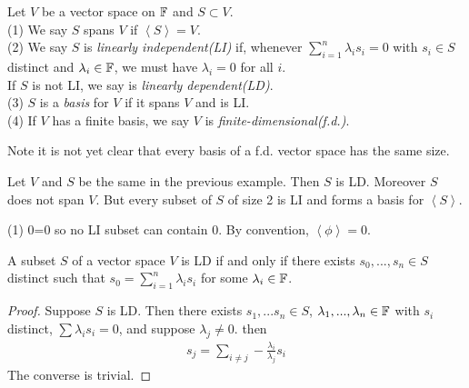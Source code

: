 \documentclass[a4paper]{article}
\begin{document}
\begin{defi}
Let $V$ be a vector space on $\mathbb{F}$ and $S \subset V$.\\
(1) We say $S$ spans $V$ if $\left<S\right> = V$.\\
(2) We say $S$ is \emph{linearly independent(LI)} if, whenever $\sum_{i=1}^n \lambda_i s_i = 0$ with $s_i \in S$ distinct and $\lambda_i \in \mathbb{F}$, we must have $\lambda_i = 0$ for all $i$.\\
If $S$ is not LI, we say is \emph{linearly dependent(LD)}.\\
(3) $S$ is a \emph{basis} for $V$ if it spans $V$ and is LI.\\
(4) If $V$ has a finite basis, we say $V$ is \emph{finite-dimensional(f.d.)}.
\end{defi}

Note it is not yet clear that every basis of a f.d. vector space has the same size.

\begin{eg}
Let $V$ and $S$ be the same in the previous example. Then $S$ is LD. Moreover $S$ does not span $V$. But every subset of $S$ of size 2 is LI and forms a basis for $\left<S\right>$.
\end{eg}

\begin{rem}
(1) 0=0 so no LI subset can contain $0$. By convention, $\left<\phi\right> = 0$.
\end{rem}

\begin{lemma}
A subset $S$ of a vector space $V$ is LD if and only if there exists $s_0,...,s_n \in S$ distinct such that $s_0 = \sum_{i=1}^n \lambda_i s_i$ for some $\lambda_i \in \mathbb{F}$.
\begin{proof}
Suppose $S$ is LD. Then there exists $s_1,...s_n\in S$, $\lambda_1,...,\lambda_n\in \mathbb{F}$ with $s_i$ distinct, $\sum \lambda_i s_i = 0$, and suppose $\lambda_j \neq 0$. then
\begin{equation*}
\begin{aligned}
s_j = \sum_{i\neq j} -\frac{\lambda_i}{\lambda_j} s_i
\end{aligned}
\end{equation*}
The converse is trivial.
\end{proof}
\end{lemma}
\end{document}
